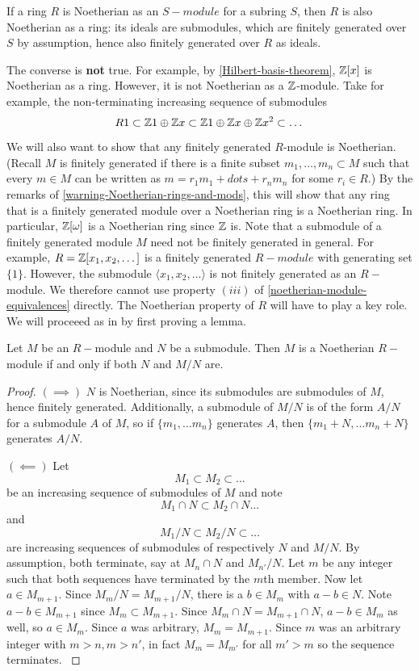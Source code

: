 \begin{remark} \label{warning-Noetherian-rings-and-mods}
If a ring $R$ is Noetherian as an $S-module$ for a subring $S$, then $R$ is also Noetherian as a ring: its ideals are submodules, which are finitely generated over $S$ by assumption, hence also finitely generated over $R$ as ideals.

The converse is \textbf{not} true. For example, by \cref{Hilbert-basis-theorem}, $\mathbb{Z}[x]$ is Noetherian as a ring. However, it is not Noetherian as a $\mathbb{Z}$-module. Take for example, the non-terminating increasing sequence of submodules
$$R1 \subset \mathbb{Z}  1\oplus \mathbb{Z} x\subset \mathbb{Z}  1\oplus \mathbb{Z}  x\oplus \mathbb{Z} x^2 \subset \dots $$
\end{remark}

We will also want to show that any finitely generated $R$-module is Noetherian. (Recall $M$ is finitely generated if there is a finite subset ${m_1,\dots,m_n}\subset M$ such that every $m\in M$ can be written as $m=r_1m_1+dots+r_nm_n$ for some $r_i\in R.$) By the remarks of \cref{warning-Noetherian-rings-and-mods}, this will show that any ring that is a finitely generated module over a Noetherian ring is a Noetherian ring. In particular, $\mathbb{Z}[\omega]$ is a Noetherian ring since $\mathbb{Z}$ is. Note that a submodule of a finitely generated module $M$ need not be finitely generated in general. For example, $R=\mathbb{Z}[x_1,x_2,\dots]$ is a finitely generated $R-module$ with generating set $\{1\}$. However, the submodule $\langle x_1,x_2,\dots\rangle$ is not finitely generated as an $R-$module. We therefore cannot use property $(iii)$ of \cref{noetherian-module-equivalences} directly. The Noetherian property of $R$ will have to play a key role. We will proceeed as in \cite{Wright} by first proving a lemma.

\begin{lemma}
Let $M$ be an $R-$module and $N$ be a submodule. Then $M$ is a Noetherian $R-$module if and only if both $N$ and $M/N$ are.
\end{lemma}
\begin{proof}
$(\implies)$ $N$ is Noetherian, since its submodules are submodules of $M$, hence finitely generated. Additionally, a submodule of $M/N$ is of the form $A/N$ for a submodule $A$ of $M$, so if $\{m_1,\dots m_n\}$ generates $A$, then $\{m_1+N,\dots m_n +N\}$ generates $A/N$.

$(\impliedby)$ Let $$M_1\subset M_2\subset \dots$$ be an increasing sequence of submodules of $M$ and note $$M_1\cap N\subset M_2\cap N \dots $$ and $$M_1/N\subset M_2/N\subset \dots$$ are increasing sequences of submodules of respectively $N$ and $M/N$. By assumption, both terminate, say at $M_n\cap N$ and $M_{n'}/N$. Let $m$ be any integer such that both sequences have terminated by the $m$th member. Now let $a\in M_{m+1}$. Since $M_m/N=M_{m+1}/N$, there is a $b\in M_m$ with $a-b\in N$. Note $a-b\in M_{m+1}$ since $M_m\subset M_{m+1}$. Since $M_m\cap N=M_{m+1}\cap N$, $a-b\in M_m$ as well, so $a\in M_m$. Since $a$ was arbitrary, $M_m=M_{m+1}$. Since $m$ was an arbitrary integer with $m>n,m>n'$, in fact $M_m=M_{m'}$ for all $m'>m$ so the sequence terminates.
\cite{Wright}
\end{proof}

